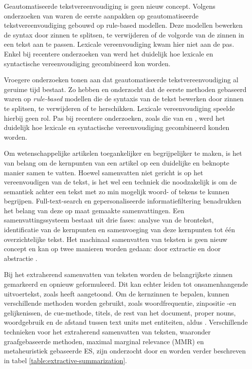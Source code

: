 \medspace

Geautomatiseerde tekstvereenvoudiging is geen nieuw concept. Volgens onderzoeken van \textcite{Canning2000, Siddharthan2006} waren de eerste aanpakken op geautomatiseerde tekstvereenvoudiging gebouwd op rule-based modellen. Deze modellen bewerken de syntax door zinnen te splitsen, te verwijderen of de volgorde van de zinnen in een tekst aan te passen. Lexicale vereenvoudiging kwam hier niet aan de pas. Enkel bij recentere onderzoeken van \textcite{Coster2011, Bulte2018} werd het duidelijk hoe lexicale en syntactische vereenvoudiging gecombineerd kon worden.

\medspace

Vroegere onderzoeken tonen aan dat geautomatiseerde tekstvereenvoudiging al geruime tijd bestaat. Zo hebben \textcite{Canning2000} en \textcite{Siddharthan2006} onderzocht dat de eerste methoden gebaseerd waren op \textit{rule-based} modellen die de syntaxis van de tekst bewerken door zinnen te splitsen, te verwijderen of te herschikken. Lexicale vereenvoudiging speelde hierbij geen rol. Pas bij recentere onderzoeken, zoals die van \textcite{Coster2011} en \textcite{Bulte2018}, werd het duidelijk hoe lexicale en syntactische vereenvoudiging gecombineerd konden worden.

\medspace

Om wetenschappelijke artikelen toegankelijker en begrijpelijker te maken, is het van belang om de kernpunten van een artikel op een duidelijke en beknopte manier samen te vatten. Hoewel samenvatten niet gericht is op het vereenvoudigen van de tekst, is het wel een techniek die noodzakelijk is om de semantiek achter een tekst met zo min mogelijk woord- of tekens te kunnen begrijpen. Full-text-search en gepersonaliseerde informatiefiltering benadrukken het belang van deze op maat gemaakte samenvattingen. Een samenvattingssysteem bestaat uit drie fases: analyse van de brontekst, identificatie van de kernpunten en samenvoeging van deze kernpunten tot één overzichtelijke tekst. Het machinaal samenvatten van teksten is geen nieuw concept en kan op twee manieren worden gedaan: door extractie en door abstractie \autocite{Hahn2000, Dubay2004}.

\medspace

Bij het extraherend samenvatten van teksten worden de belangrijkste zinnen gemarkeerd en opnieuw geformuleerd. Dit kan echter leiden tot onsamenhangende uitvoertekst, zoals \textcite{Khan2014} heeft aangetoond. Om de kernzinnen te bepalen, kunnen verschillende methoden worden gebruikt, zoals woordfrequentie, zinpositie -en gelijkenissen, de cue-methode, titels, de rest van het document, proper nouns, woordgebruik en de afstand tussen text units met entiteiten, aldus \textcite{Khan2014}. Verschillende technieken voor het extraherend samenvatten van teksten, waaronder graafgebaseerde methoden, maximal marginal relevance (MMR) en metaheuristiek gebaseerde ES, zijn onderzocht door \textcite{Verma2020} en worden verder beschreven in tabel \ref{table:extractive-summarization}.


